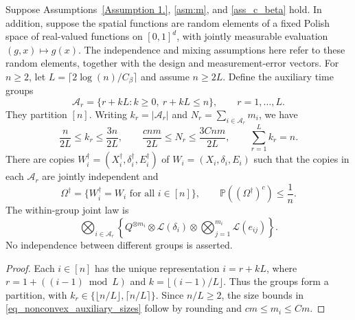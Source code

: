 \documentclass[twoside,11pt]{article}
\newenvironment{revision}{\color{revisionred}}{}
\begin{document}
\begin{revision}
\begin{lemma}
\label{lem_nonconvex_auxiliary_groups}
Suppose Assumptions~\ref{Assumption 1.}, \ref{asm:m}, and
\ref{ass_c_beta} hold. In addition, suppose the spatial functions
are random elements of a fixed Polish space of real-valued functions
on $[0,1]^d$, with jointly measurable evaluation $(g,x)\mapsto g(x)$.
The independence and mixing assumptions here refer to these random
elements, together with the design and measurement-error vectors.
For $n\geq2$, let $L=\lceil2\log(n)/C_\beta\rceil$ and assume $n\geq2L$.
Define the auxiliary time groups
\begin{equation}
\label{eq_nonconvex_auxiliary_groups}
\mathcal A_r=\{r+kL:k\geq0,\ r+kL\leq n\},
\qquad r=1,\ldots,L.
\end{equation}
They partition $[n]$. Writing $k_r=|\mathcal A_r|$ and
$N_r=\sum_{i\in\mathcal A_r}m_i$, we have
\begin{equation}
\label{eq_nonconvex_auxiliary_sizes}
\frac{n}{2L}\leq k_r\leq\frac{3n}{2L},\qquad
\frac{cnm}{2L}\leq N_r\leq\frac{3Cnm}{2L},
\qquad\sum_{r=1}^L k_r=n.
\end{equation}
There are copies $W_i^\dagger=(X_i^\dagger,\delta_i^\dagger,
E_i^\dagger)$ of $W_i=(X_i,\delta_i,E_i)$ such that the copies in
each $\mathcal A_r$ are jointly independent and
\begin{equation}
\label{eq_nonconvex_auxiliary_matching}
\Omega^\dagger=\{W_i^\dagger=W_i\text{ for all }i\in[n]\},
\qquad
\mathbb P((\Omega^\dagger)^c)\leq\frac1n.
\end{equation}
The within-group joint law is
\begin{equation}
\label{eq_nonconvex_auxiliary_product}
\bigotimes_{i\in\mathcal A_r}
\left\{Q^{\otimes m_i}\otimes\mathcal L(\delta_i)
                    \otimes\bigotimes_{j=1}^{m_i}\mathcal L(e_{ij})\right\}.
\end{equation}
No independence between different groups is asserted.
\end{lemma}
\begin{proof}
Each $i\in[n]$ has the unique representation
$i=r+kL$, where $r=1+((i-1)\bmod L)$ and
$k=\lfloor(i-1)/L\rfloor$. Thus the groups form a partition, with
$k_r\in\{\lfloor n/L\rfloor,\lceil n/L\rceil\}$.
Since $n/L\geq2$, the size bounds in
\eqref{eq_nonconvex_auxiliary_sizes} follow by rounding and
$cm\leq m_i\leq Cm$.


\end{proof}
\end{revision}
\end{document}
